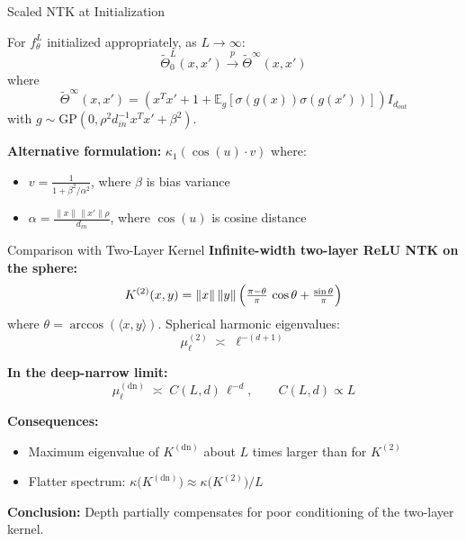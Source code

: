 \documentclass{beamer}
\newcommand{\E}{\mathbb{E}}
\begin{document}
\begin{frame}{Scaled NTK at Initialization}
\begin{theorem}
For $f^L_\theta$ initialized appropriately, as $L \to \infty$:
\[ \tilde{\Theta}^L_0(x, x') \xrightarrow{p} \tilde{\Theta}^\infty(x, x') \]
where
\[ \tilde{\Theta}^\infty(x, x') = (x^T x' + 1 + \E_g[\sigma(g(x))\sigma(g(x'))]) I_{d_{out}} \]
with $g \sim \text{GP}(0, \rho^2 d_{in}^{-1} x^T x' + \beta^2)$.
\end{theorem}

\textbf{Alternative formulation:} $\kappa_1(\cos(u) \cdot v)$ where:
\begin{itemize}
\item $v = \frac{1}{1 + \beta^2/\alpha^2}$, where $\beta$ is bias variance
\item $\alpha = \frac{\|x\| \|x'\| \rho}{d_{in}}$, where $\cos(u)$ is cosine distance
\end{itemize}
\end{frame}

\begin{frame}{Comparison with Two-Layer Kernel}
\textbf{Infinite-width two-layer ReLU NTK on the sphere:}
\[
  K^{(2)}(x,y)=\|x\|\,\|y\|\,\Bigl(\tfrac{\pi-\theta}{\pi}\,\cos \theta + \tfrac{\sin\theta}{\pi}\Bigr)
\]
where $\theta=\arccos(\langle x,y\rangle)$. Spherical harmonic eigenvalues:
\[
  \mu_\ell^{(2)}\;\asymp\;\ell^{-(d+1)}
\]

\textbf{In the deep-narrow limit:}
\[
   \mu_\ell^{(\text{dn})}\;\asymp\;C(L,d)\,\ell^{-d}, \qquad C(L,d)\propto L
\]

\textbf{Consequences:}
\begin{itemize}
  \item Maximum eigenvalue of $K^{(\text{dn})}$ about $L$ times larger than for $K^{(2)}$
  \item Flatter spectrum: $\kappa\bigl(K^{(\text{dn})}\bigr)\approx\kappa\bigl(K^{(2)}\bigr)/L$
\end{itemize}

\textbf{Conclusion:} Depth partially compensates for poor conditioning of the two-layer kernel.
\end{frame}
\end{document}
